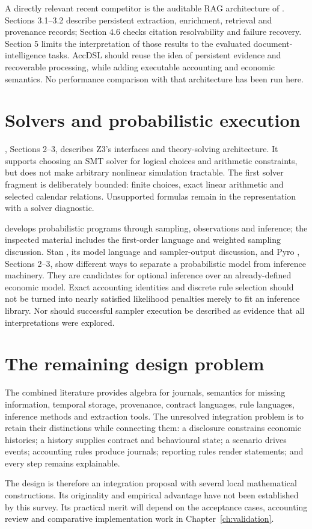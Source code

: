 A directly relevant recent competitor is the auditable RAG architecture of
\citet{cosentino2026}. Sections 3.1--3.2 describe persistent extraction,
enrichment, retrieval and provenance records; Section 4.6 checks citation
resolvability and failure recovery. Section 5 limits the interpretation of
those results to the evaluated document-intelligence tasks. AccDSL should
reuse the idea of persistent evidence and recoverable processing, while adding
executable accounting and economic semantics. No performance comparison with
that architecture has been run here.

\section{Solvers and probabilistic execution}

\citet{damoura2008}, Sections 2--3, describes Z3's interfaces and theory-solving
architecture. It supports choosing an SMT solver for logical choices and
arithmetic constraints, but does not make arbitrary nonlinear simulation
tractable. The first solver fragment is deliberately bounded: finite choices,
exact linear arithmetic and selected calendar relations. Unsupported formulas
remain in the representation with a solver diagnostic.

\citet{vandeMeent2018} develops probabilistic programs through sampling,
observations and inference; the inspected material includes the first-order
language and weighted sampling discussion. Stan \citep{carpenter2017}, its
model language and sampler-output discussion, and Pyro \citep{bingham2019},
Sections 2--3, show different ways to separate a probabilistic model from
inference machinery. They are candidates for optional inference over an
already-defined economic model. Exact accounting identities and discrete rule
selection should not be turned into nearly satisfied likelihood penalties
merely to fit an inference library. Nor should successful sampler execution
be described as evidence that all interpretations were explored.

\clearpage
\section{The remaining design problem}

The combined literature provides algebra for journals, semantics for missing
information, temporal storage, provenance, contract languages, rule languages,
inference methods and extraction tools. The unresolved integration problem is
to retain their distinctions while connecting them: a disclosure constrains
economic histories; a history supplies contract and behavioural state; a
scenario drives events; accounting rules produce journals; reporting rules
render statements; and every step remains explainable.

The design is therefore an integration proposal with several local
mathematical constructions. Its originality and empirical advantage have not
been established by this survey. Its practical merit will depend on the
acceptance cases, accounting review and comparative implementation work in
Chapter~\ref{ch:validation}.
